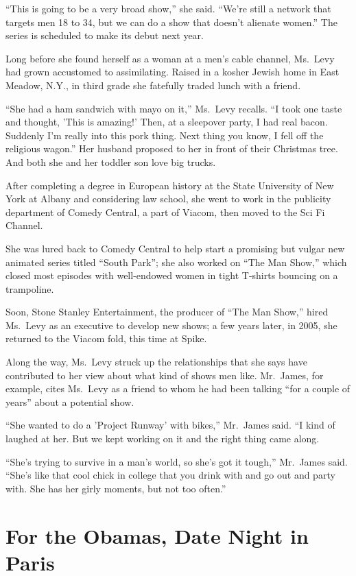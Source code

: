 \documentclass[12pt,a4paper,onecolumn]{article}
\begin{document}
``This is going to be a very broad show,'' she said. ``We're still a network that targets men 18 to
34, but we can do a show that doesn't alienate women.'' The series is scheduled to make its debut
next year.

Long before she found herself as a woman at a men's cable channel, Ms.~Levy had grown accustomed to
assimilating. Raised in a kosher Jewish home in East Meadow, N.Y., in third grade she fatefully
traded lunch with a friend.

``She had a ham sandwich with mayo on it,'' Ms.~Levy recalls. ``I took one taste and thought, 'This
is amazing!' Then, at a sleepover party, I had real bacon. Suddenly I'm really into this pork thing.
Next thing you know, I fell off the religious wagon.'' Her husband proposed to her in front of their
Christmas tree. And both she and her toddler son love big trucks.

After completing a degree in European history at the State University of New York at Albany and
considering law school, she went to work in the publicity department of Comedy Central, a part of
Viacom, then moved to the Sci Fi Channel.

She was lured back to Comedy Central to help start a promising but vulgar new animated series titled
``South Park''; she also worked on ``The Man Show,'' which closed most episodes with well-endowed
women in tight T-shirts bouncing on a trampoline.

Soon, Stone Stanley Entertainment, the producer of ``The Man Show,'' hired Ms.~Levy as an executive
to develop new shows; a few years later, in 2005, she returned to the Viacom fold, this time at
Spike.

Along the way, Ms.~Levy struck up the relationships that she says have contributed to her view about
what kind of shows men like. Mr.~James, for example, cites Ms.~Levy as a friend to whom he had been
talking ``for a couple of years'' about a potential show.

``She wanted to do a 'Project Runway' with bikes,'' Mr.~James said. ``I kind of laughed at her. But
we kept working on it and the right thing came along.

``She's trying to survive in a man's world, so she's got it tough,'' Mr.~James said. ``She's like
that cool chick in college that you drink with and go out and party with. She has her girly moments,
but not too often.''

\section{For the Obamas, Date Night in Paris}
\end{document}
